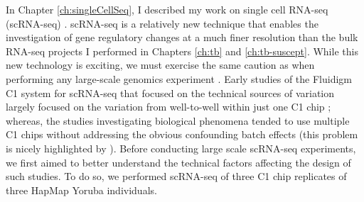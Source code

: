In Chapter \ref{ch:singleCellSeq}, I described my work on single cell
RNA-seq (scRNA-seq) \citep{Tung2016}. scRNA-seq is a relatively
new technique \citep{Liang2014, Macaulay2014, Saliba2014, Grun2015, Stegle2015, Bacher2016}
that enables the investigation of gene regulatory
changes at a much finer resolution than the bulk RNA-seq projects I
performed in Chapters \ref{ch:tb} and \ref{ch:tb-suscept}. While this
new technology is exciting, we must exercise the same caution as when
performing any large-scale genomics experiment \citep{Auer2010, Leek2010, Gilad2015}. Early studies of the
Fluidigm C1 system for scRNA-seq that focused on the technical sources
of variation largely focused on the variation from well-to-well within
just one C1 chip \citep{Brennecke2013, Grun2014, Islam2014, Ding2015, Vallejos2015}
; whereas, the studies investigating biological
phenomena tended to use multiple C1 chips without addressing the
obvious confounding batch effects (this problem is nicely highlighted
by \citep{Hicks2015}). Before conducting large scale scRNA-seq
experiments, we first aimed to better understand the technical factors
affecting the design of such studies. To do so, we performed scRNA-seq
of three C1 chip replicates of three HapMap \citep{HapMap2005} Yoruba individuals.

